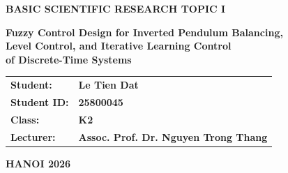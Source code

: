 \begin{titlepage}
\begin{center}
	\hspace{0.5 cm} \textbf{\fontsize{18pt}{0pt} \selectfont BASIC SCIENTIFIC RESEARCH TOPIC I} \\[1cm]

	\begin{center}
		\hspace{0.5 cm} \centering \textbf{\fontsize{15pt}{0pt} \selectfont Fuzzy Control Design for Inverted Pendulum Balancing, \\ [0.5cm]
		Level Control, and Iterative Learning Control \\ [0.5cm]
		of Discrete-Time Systems}
	\end{center}
	
	\vspace{1.4cm}
	
	\begin{tabular}{@{}p{3.5cm} l@{}}
		\textbf{Student:} 		& \textbf{Le Tien Dat} 	\\[0.5cm]
		\textbf{Student ID:}  	& \textbf{25800045}         \\[0.5cm]
		\textbf{Class:}         & \textbf{K2}		\\[1.0cm]
		\textbf{Lecturer:}    & \textbf{Assoc. Prof. Dr. Nguyen Trong Thang}
	\end{tabular}
\end{center}

\vspace{6cm}

\begin{center}
	\textbf{\fontsize{14pt}{0pt} \selectfont HANOI 2026}
\end{center}

\end{titlepage}